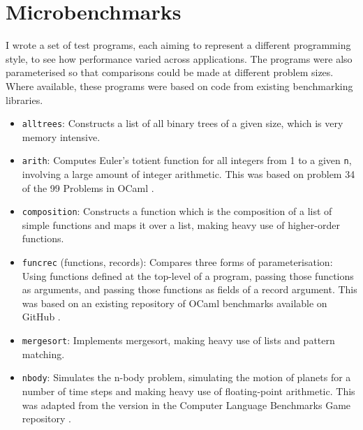 \newpage
\section{Microbenchmarks}
I wrote a set of test programs, each aiming to represent a different programming style, to see how performance varied across applications. The programs were also parameterised so that comparisons could be made at different problem sizes. %
Where available, these programs were based on code from existing benchmarking libraries.

\begin{itemize}
\item \verb|alltrees|: Constructs a list of all binary trees of a given size, which is very memory intensive. %

\item \verb|arith|: Computes Euler's totient function for all integers from 1 to a given \verb|n|, involving a large amount of integer arithmetic. This was based on problem 34 of the 99 Problems in OCaml \cite{99-problems}.%

\item \verb|composition|: Constructs a function which is the composition of a list of simple functions and maps it over a list, making heavy use of higher-order functions.

\item \verb|funcrec| (functions, records): Compares three forms of parameterisation: Using functions defined at the top-level of a program, passing those functions as arguments, and passing those functions as fields of a record argument. This was based on an existing repository of OCaml benchmarks available on GitHub \cite{chris00}.

\item \verb|mergesort|: Implements mergesort, making heavy use of lists and pattern matching.

\item \verb|nbody|: Simulates the n-body problem, simulating the motion of planets for a number of time steps and making heavy use of floating-point arithmetic. This was adapted from the version in the Computer Language Benchmarks Game repository \cite{benchmark-game}.
\end{itemize}

